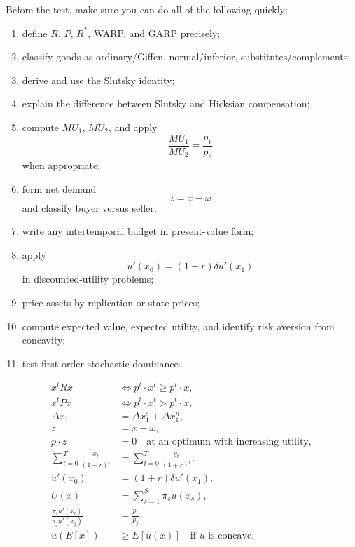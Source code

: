 \begin{examtip}[title={Part I final checklist}]
Before the test, make sure you can do all of the following quickly:
\begin{enumerate}
    \item define $R$, $P$, $R^*$, WARP, and GARP precisely;
    \item classify goods as ordinary/Giffen, normal/inferior, substitutes/complements;
    \item derive and use the Slutsky identity;
    \item explain the difference between Slutsky and Hicksian compensation;
    \item compute $MU_1$, $MU_2$, and apply
    \[
    \frac{MU_1}{MU_2}=\frac{p_1}{p_2}
    \]
    when appropriate;
    \item form net demand
    \[
    z=x-\omega
    \]
    and classify buyer versus seller;
    \item write any intertemporal budget in present-value form;
    \item apply
    \[
    u'(x_0)=(1+r)\delta u'(x_1)
    \]
    in discounted-utility problems;
    \item price assets by replication or state prices;
    \item compute expected value, expected utility, and identify risk aversion from concavity;
    \item test first-order stochastic dominance.
\end{enumerate}
\end{examtip}

\begin{keyformula}[title={Key Formula: Part I memory sheet}]
\begin{align*}
x^t R x &\iff p^t\cdot x^t \ge p^t\cdot x, \\
x^t P x &\iff p^t\cdot x^t > p^t\cdot x, \\
\Delta x_1 &= \Delta x_1^s + \Delta x_1^n, \\
z &= x-\omega, \\
p\cdot z &= 0 \quad \text{at an optimum with increasing utility}, \\
\sum_{t=0}^{T}\frac{x_t}{(1+r)^t} &= \sum_{t=0}^{T}\frac{y_t}{(1+r)^t}, \\
u'(x_0) &= (1+r)\delta u'(x_1), \\
U(x) &= \sum_{s=1}^S \pi_s u(x_s), \\
\frac{\pi_i u'(x_i)}{\pi_j u'(x_j)} &= \frac{p_i}{p_j}, \\
u(E[x]) &\ge E[u(x)] \quad \text{if } u \text{ is concave}.
\end{align*}
\end{keyformula}
